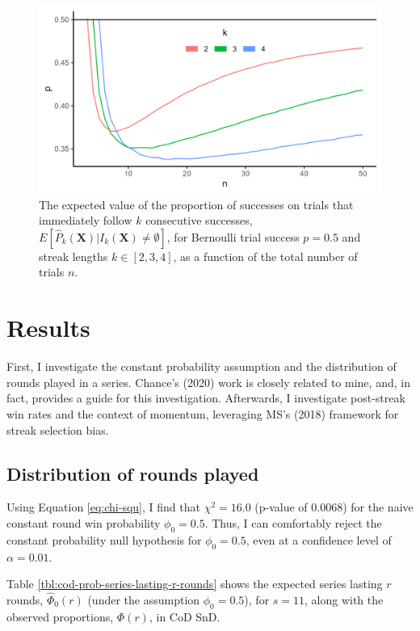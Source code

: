 \documentclass{article}
\begin{document}
\begin{figure}
\centering
\includegraphics{images/npkd.png}
\caption{The expected value of the proportion of successes on trials that immediately follow $k$ consecutive successes, $E[\hat{P}_k(\mathbf{X}) | I_k(\mathbf{X}) \neq \emptyset]$, for Bernoulli trial success $p = 0.5$ and streak lengths $k \in [2, 3, 4]$, as a function of the total number of trials $n.$}
\end{figure}

\hypertarget{results}{%
\section{Results}\label{results}}

First, I investigate the constant probability assumption and the
distribution of rounds played in a series. Chance's (2020) work is
closely related to mine, and, in fact, provides a guide for this
investigation. Afterwards, I investigate post-streak win rates and the
context of momentum, leveraging MS's (2018) framework for streak
selection bias.

\hypertarget{sec:results-rounds-played}{%
\subsection{Distribution of rounds
played}\label{sec:results-rounds-played}}

Using Equation \ref{eq:chi-squ}, I find that \(\chi^2 = 16.0\) (p-value
of 0.0068) for the naive constant round win probability
\(\phi_0 = 0.5\). Thus, I can comfortably reject the constant
probability null hypothesis for \(\phi_0 = 0.5\), even at a confidence
level of \(\alpha = 0.01\).

Table \ref{tbl:cod-prob-series-lasting-r-rounds} shows the expected
series lasting \(r\) rounds, \(\hat{\Phi}_0(r)\) (under the assumption
\(\phi_0 = 0.5\)), for \(s = 11\), along with the observed proportions,
\(\Phi(r)\), in CoD SnD.
\end{document}
